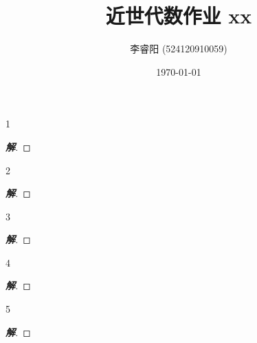 \documentclass[12pt, a4paper]{article}
\title{近世代数作业 xx}
\author{李睿阳 (524120910059)}
\date{\today}
\newenvironment{solution}{
    \begin{proof}[\textbf{解}]
}{
    \end{proof}
}
\begin{document}
\maketitle


\begin{problem}{1}
    
\end{problem}
\begin{solution}
    
\end{solution}


\begin{problem}{2}
    
\end{problem}
\begin{solution}
    
\end{solution}


\begin{problem}{3}
    
\end{problem}
\begin{solution}
    
\end{solution}
    

\begin{problem}{4}
    
\end{problem}
\begin{solution}
    
\end{solution}


\begin{problem}{5}
    
\end{problem}
\begin{solution}

\end{solution}
\end{document}

